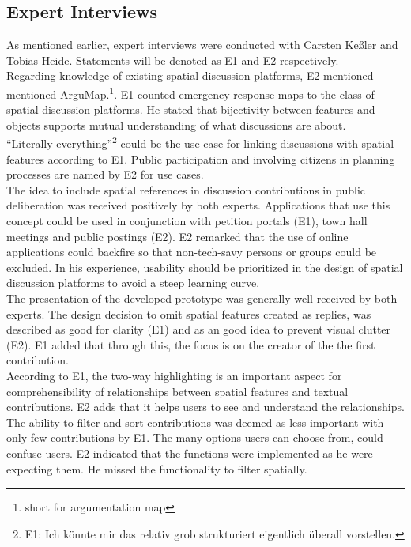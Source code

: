 \subsection{Expert Interviews}
\label{sub:ev_expert_interviews}
As mentioned earlier, expert interviews were conducted with Carsten Ke{\ss}ler and Tobias Heide. Statements will be denoted as E1 and E2 respectively.\\
Regarding knowledge of existing spatial discussion platforms, E2 mentioned mentioned ArguMap.\footnote{short for argumentation map}. E1 counted emergency response maps to the class of spatial discussion platforms. He stated that bijectivity between features and objects supports mutual understanding of what discussions are about.\\
``Literally everything''\footnote{E1: Ich k{\"o}nnte mir das relativ grob strukturiert eigentlich {\"u}berall vorstellen.} could be the use case for linking discussions with spatial features according to E1. Public participation and involving citizens in planning processes are named by E2 for use cases.\\
The idea to include spatial references in discussion contributions in public deliberation was received positively by both experts. Applications that use this concept could be used in conjunction with petition portals (E1), town hall meetings and public postings (E2). E2 remarked that the use of online applications could backfire so that non-tech-savy persons or groups could be excluded. In his experience, usability should be prioritized in the design of spatial discussion platforms to avoid a steep learning curve.\\
The presentation of the developed prototype was generally well received by both experts. The design decision to omit spatial features created as replies, was described as good for clarity (E1) and as an good idea to prevent visual clutter (E2). E1 added that through this, the focus is on the creator of the the first contribution.\\
According to E1, the two-way highlighting is an important aspect for comprehensibility of relationships between spatial features and textual contributions. E2 adds that it helps users to see and understand the relationships.\\
The ability to filter and sort contributions was deemed as less important with only few contributions by E1. The many options users can choose from, could confuse users. E2 indicated that the functions were implemented as he were expecting them. He missed the functionality to filter spatially.\\
